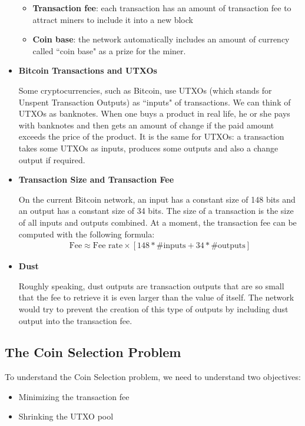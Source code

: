 \begin{itemize}
\begin{itemize}
        \item \textbf{Transaction fee}: each transaction has an amount of transaction fee to attract miners to include it into a new block
        \item \textbf{Coin base}: the network automatically includes an amount of currency called ``coin base" as a prize for the miner.
      \end{itemize}
    \item \textbf{Bitcoin Transactions and UTXOs}
      \par Some cryptocurrencies, such as Bitcoin, use UTXOs (which stands for Unspent Transaction Outputs) as ``inputs" of transactions. We can think of UTXOs as banknotes. When one buys a product in real life, he or she pays with banknotes and then gets an amount of change if the paid amount exceeds the price of the product. It is the same for UTXOs: a transaction takes some UTXOs as inputs, produces some outputs and also a change output if required.
    \item \textbf{Transaction Size and Transaction Fee}
      \par On the current Bitcoin network, an input has a constant size of 148 bits and an output has a constant size of 34 bits. The size of a transaction is the size of all inputs and outputs combined. At a moment, the transaction fee can be computed with the following formula:
      \begin{align*}
        \text{Fee} \approx \text{Fee rate} \times [148 * \text{\# inputs} + 34 * \text{\# outputs}]
      \end{align*}
    \item \textbf{Dust}
      \par Roughly speaking, dust outputs are transaction outputs that are so small that the fee to retrieve it is even larger than the value of itself. The network would try to prevent the creation of this type of outputs by including dust output into the transaction fee.
  \end{itemize}

  \subsection{The Coin Selection Problem}
    \par To understand the Coin Selection problem, we need to understand two objectives:
      \begin{itemize}
        \item Minimizing the transaction fee
        \item Shrinking the UTXO pool
      \end{itemize}

